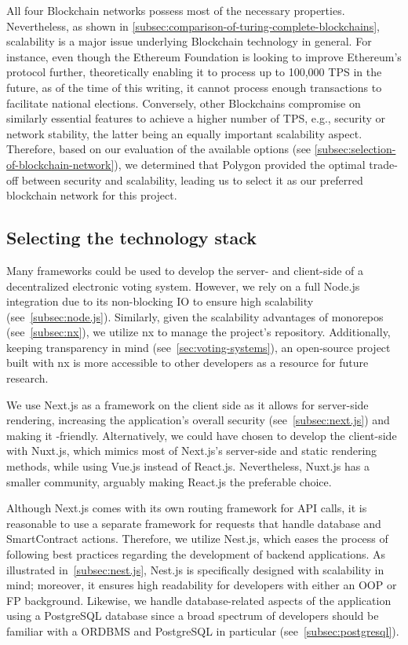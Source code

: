 All four \gls{Blockchain} networks possess most of the necessary properties.
Nevertheless, as shown in \cref{subsec:comparison-of-turing-complete-blockchains}, scalability is a major issue underlying \gls{Blockchain} technology in general.
For instance, even though the Ethereum Foundation is looking to improve Ethereum's protocol further, theoretically enabling it to process up to 100,000 \gls{TPS} in the future, as of the time of this writing, it cannot process enough transactions to facilitate national elections.
Conversely, other \glspl{Blockchain} compromise on similarly essential features to achieve a higher number of \gls{TPS}, e.g., security or network stability, the latter being an equally important scalability aspect.
Therefore, based on our evaluation of the available options (see \cref{subsec:selection-of-blockchain-network}), we determined that Polygon provided the optimal trade-off between security and scalability, leading us to select it as our preferred blockchain network for this project.

\subsection{Selecting the technology stack}\label{subsec:selection-of-tech-stack}

Many frameworks could be used to develop the server- and client-side of a decentralized electronic voting system.
However, we rely on a full Node.js integration due to its non-blocking \gls{IO} to ensure high scalability (see~\cref{subsec:node.js}).
Similarly, given the scalability advantages of monorepos (see~\cref{subsec:nx}), we utilize nx to manage the project's repository.
Additionally, keeping transparency in mind (see~\cref{sec:voting-systems}), an open-source project built with nx is more accessible to other developers as a resource for future research.

We use Next.js as a framework on the client side as it allows for server-side rendering, increasing the application's overall security (see~\cref{subsec:next.js}) and making it -friendly.
Alternatively, we could have chosen to develop the client-side with Nuxt.js, which mimics most of Next.js's server-side and static rendering methods, while using Vue.js instead of React.js.
Nevertheless, Nuxt.js has a smaller community, arguably making React.js the preferable choice.

Although Next.js comes with its own routing framework for API calls, it is reasonable to use a separate framework for requests that handle database and \gls{SmartContract} actions.
Therefore, we utilize Nest.js, which eases the process of following best practices regarding the development of backend applications.
As illustrated in~\cref{subsec:nest.js}, Nest.js is specifically designed with scalability in mind;
moreover, it ensures high readability for developers with either an \gls{OOP} or \gls{FP} background.
Likewise, we handle  database-related aspects of the application using a PostgreSQL database since a broad spectrum of developers should be familiar with a \gls{ORDBMS} and PostgreSQL in particular (see~\cref{subsec:postgresql}).

